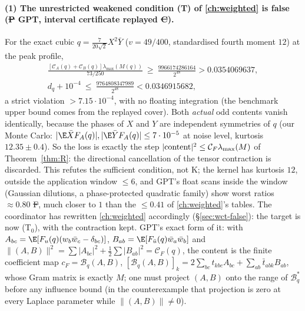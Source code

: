 \paragraph{(1) The unrestricted weakened condition (T) of \autoref{ch:weighted} is false (\st{P} GPT, interval certificate replayed \st{C}).} For the exact cubic
$q=\frac7{20\sqrt2}X^2\bar Y$ ($v=49/400$, standardised fourth moment $12$) at the peak profile,
\[\begin{gathered}
\frac{[\mathcal C_A(q)+\mathcal C_B(q)]\lambda_{\max}(M(q))}{73/250}\ \ge\ \frac{9966174286164}{2^{48}}>0.0354069637,\\
 d_q+10^{-4}\ \le\ \frac{9764808347989}{2^{48}}<0.0346915682,
\end{gathered}\]
a strict violation $>7.15\cdot10^{-4}$, with no floating integration (the benchmark upper bound comes from the replayed cover). Both \emph{actual} odd contents vanish identically, because the
phases of $X$ and $Y$ are independent symmetries of $q$ (our Monte Carlo: $|\E\bar XF_A(q)|,|\E\bar YF_A(q)|\le7\cdot10^{-5}$ at noise level, kurtosis $12.35\pm0.4$). So the loss is exactly the step
$|{\rm content}|^2\le\mathcal C_F\lambda_{\max}(M)$ of Theorem~\ref{thm:R}: the directional cancellation of the tensor contraction is discarded. This refutes the sufficient condition, not K;
the kernel has kurtosis $12$, outside the application window $\le6$, and GPT's float scans inside the window (Gaussian dilutions, a phase-protected quadratic family) show worst ratios
$\approx0.80$ \st{F}, much closer to $1$ than the $\le0.41$ of \autoref{ch:weighted}'s tables. The coordinator has rewritten \autoref{ch:weighted} accordingly (\S\ref{sec:wct-false}): the target is now
(T$_0$), with the contraction kept. GPT's exact form of it: with $A_{bc}=\E[F_u(q)(w_b\bar w_c-\delta_{bc})]$, $B_{ab}=\E[F_{\bar u}(q)\bar w_a\bar w_b]$ and $\|(A,B)\|^2=\sum|A_{bc}|^2+\frac12\sum|B_{ab}|^2=\mathcal C_F(q)$,
the content is the finite coefficient map $c_F=\mathcal B_q(A,B)$, $[\mathcal B_q(A,B)]_k=2\sum_{bc}t_{kbc}A_{bc}+\sum_{ab}\bar t_{abk}B_{ab}$, whose Gram matrix is exactly $M$; one must project
$(A,B)$ onto the range of $\mathcal B_q^*$ before any influence bound (in the counterexample that projection is zero at every Laplace parameter while $\|(A,B)\|\ne0$).

